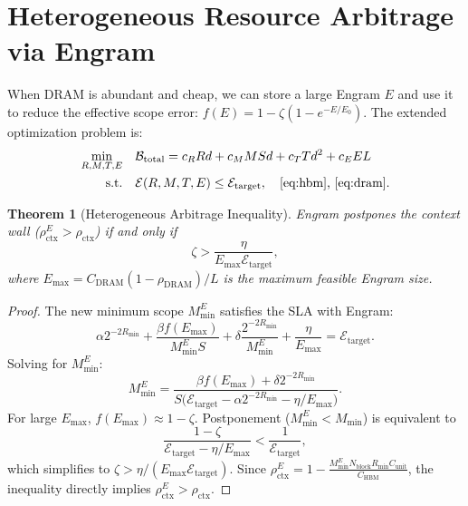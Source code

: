 \documentclass[11pt,a4paper]{article}
\theoremstyle{plain}
\newtheorem{theorem}{Theorem}[section]
\theoremstyle{definition}
\begin{document}
\section{Heterogeneous Resource Arbitrage via Engram}
\label{sec:arbitrage}
When DRAM is abundant and cheap, we can store a large Engram $E$ and use it to reduce the effective scope error: $f(E)=1-\zeta(1-e^{-E/E_0})$. The extended optimization problem is:
\begin{align}
\min_{R,M,T,E} \quad & \mathcal{B}_{\text{total}} = c_R R d + c_M M S d + c_T T d^2 + c_E E L \label{eq:cost_e}\\
\text{s.t.} \quad & \mathcal{E}(R,M,T,E) \le \mathcal{E}_{\text{target}},\quad \text{\eqref{eq:hbm}, \eqref{eq:dram}}. \label{eq:sla_e}
\end{align}

\begin{theorem}[Heterogeneous Arbitrage Inequality]
Engram postpones the context wall ($\rho_{\text{ctx}}^E > \rho_{\text{ctx}}$) if and only if
\begin{equation}
    \zeta > \frac{\eta}{E_{\max} \mathcal{E}_{\text{target}}}, \label{eq:arbitrage}
\end{equation}
where $E_{\max} = C_{\text{DRAM}}(1-\rho_{\text{DRAM}})/L$ is the maximum feasible Engram size.
\end{theorem}
\begin{proof}
The new minimum scope $M_{\min}^E$ satisfies the SLA with Engram:
\begin{equation}
    \alpha 2^{-2R_{\min}} + \frac{\beta f(E_{\max})}{M_{\min}^E S} + \delta \frac{2^{-2R_{\min}}}{M_{\min}^E} + \frac{\eta}{E_{\max}} = \mathcal{E}_{\text{target}}.
\end{equation}
Solving for $M_{\min}^E$:
\begin{equation}
    M_{\min}^E = \frac{\beta f(E_{\max}) + \delta 2^{-2R_{\min}}}{S\bigl(\mathcal{E}_{\text{target}}-\alpha 2^{-2R_{\min}} - \eta/E_{\max}\bigr)}.
\end{equation}
For large $E_{\max}$, $f(E_{\max})\approx 1-\zeta$. Postponement ($M_{\min}^E < M_{\min}$) is equivalent to
\begin{equation}
    \frac{1-\zeta}{\mathcal{E}_{\text{target}} - \eta/E_{\max}} < \frac{1}{\mathcal{E}_{\text{target}}},
\end{equation}
which simplifies to $\zeta > \eta/(E_{\max}\mathcal{E}_{\text{target}})$. Since $\rho_{\text{ctx}}^E = 1 - \frac{M_{\min}^E N_{\text{block}} R_{\min} C_{\text{unit}}}{C_{\text{HBM}}}$, the inequality directly implies $\rho_{\text{ctx}}^E > \rho_{\text{ctx}}$.
\end{proof}
\end{document}
